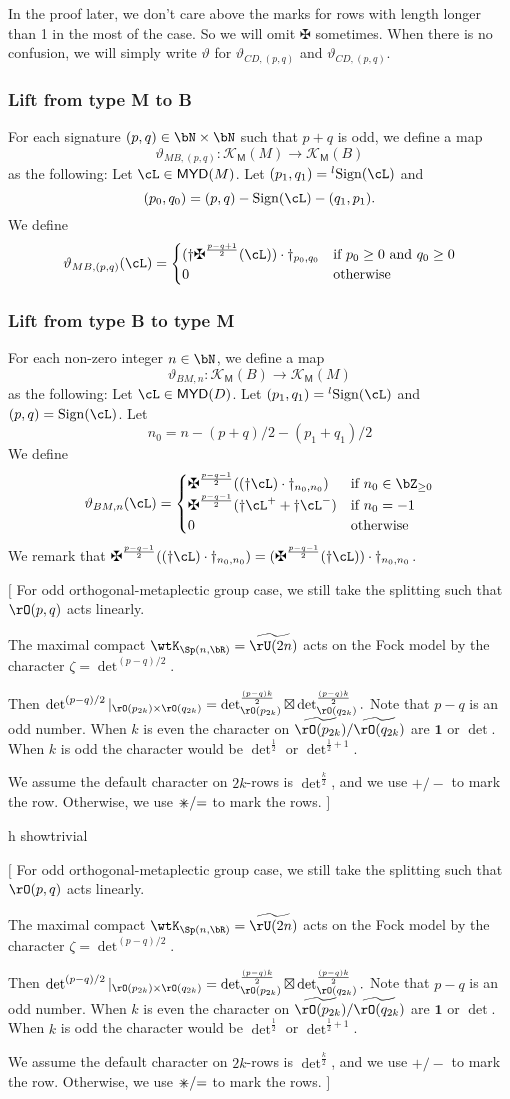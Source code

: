 \documentclass[12pt,a4paper]{amsart}
\newcommand{\trivial}[2][]{\if\relax\detokenize{#1}\relax
  {%
      \color{orange} \vspace{0em} $[$  #2 $]$
      \color{black}
  }
  \else
\ifx#1h
\ifcsname showtrivial\endcsname
{%
    \color{orange} \vspace{0em}  $[$ #2 $]$
    \color{black}
}
\fi
\else {\red Wrong argument!} \fi
\fi
}
\newcommand{\bfone}{\mathbf{1}}
\def\MYD{{\mathsf{MYD}}}
\def\KM{{\mathcal{K_{\mathsf{M}}}}}
\numberwithin{equation}{section}
\theoremstyle{remark}
\def\half{{\tfrac{1}{2}}}
\def\lsign{{}^l\mathrm{Sign}}
\def\ssign{\mathrm{Sign}}
\def\umm{{=}}
\def\upp{{\ast}}
\def\upp{
  {{\setbox0\hbox{$\times$}
      \rlap{\hbox to \wd0{\hss$+$\hss}}\box0
    }}
}
\begin{document}
{
  \color{red}
  In the proof later, we don't care above the marks for rows with length longer
  than 1 in the most of the case. So we will omit $\maltese$ sometimes.
  When there is no confusion, we will simply write $\vartheta$ for
  $\vartheta_{CD,(p,q)}$ and $\vartheta_{CD,(p,q)}$.
}


\subsubsection{Lift from type M to B}

For each signature $(p,q)\in \bN\times \bN$ such that $p+q$ is odd, we define a map
\[
  \vartheta_{MB,(p,q)} \colon \KM(M)\rightarrow \KM(B)
\]
as the following:
Let $\cL\in \MYD(M)$. Let $(p_{1},q_{1})=\lsign(\cL)$ and
\[
(p_{0}, q_{0})  = (p,q) -\ssign(\cL)-(q_{1},p_{1}).
\]
We define
\[
  \vartheta_{MB,(p,q)}(\cL) =
  \begin{cases}
    (\dagger \maltese^{\frac{p-q+1}{2}}(\cL))\cdot \dagger_{p_{0}, q_{0}} &
    \text{if } p_{0}\geq 0 \text{ and } q_{0} \geq 0\\
    0 & \text{otherwise}
  \end{cases}
\]


\subsubsection{Lift from type B to type M}

For each non-zero integer $n\in \bN$, we define a map
\[
  \vartheta_{BM,n} \colon \KM(B)\rightarrow \KM(M)
\]
as the following:
Let $\cL\in \MYD(D)$. Let $(p_{1},q_{1})=\lsign(\cL)$ and
$(p,q) = \ssign(\cL)$.
Let
\[
  n_{0} = n - (p+q)/2 - (p_{1}+q_{1})/2
\]
We define
\[
  \vartheta_{BM,n}(\cL) =
  \begin{cases}
    \maltese^{\frac{p-q-1}{2}}((\dagger \cL)\cdot \dagger_{n_{0}, n_{0}}) &
    \text{if } n_{0}\in \bZ_{\geq 0}\\
    \maltese^{\frac{p-q-1}{2}}(\dagger \cL^{+}  + \dagger \cL^{-})& \text{if } n_{0}=-1\\
    0&\text{otherwise}
  \end{cases}
\]
We remark that
$\maltese^{\frac{p-q-1}{2}}((\dagger \cL)\cdot \dagger_{n_{0}, n_{0}})= (\maltese^{\frac{p-q-1}{2}}(\dagger\cL))\cdot \dagger_{n_{0},n_{0}}$.

\trivial{
  For odd orthogonal-metaplectic group case, we still take the splitting such
  that $\rO(p,q)$ acts linearly.

  The maximal compact $\wtK_{\Sp(n,\bR)}= \widetilde{\rU(2n)}$ acts on the Fock model by the
  character $\zeta=\det^{(p-q)/2}$.

  Then
  $\det^{(p-q)/2}|_{\rO(p_{2k})\times \rO(q_{2k})}=\det^{\frac{(p-q)k}{2}}_{\rO(p_{2k})}\boxtimes
  \det^{\frac{(p-q)k}{2}}_{\rO(q_{2k})}. $
  Note that $p-q$ is an odd number.
  When $k$ is even the character on $\widetilde{\rO(p_{2k})}/\widetilde{\rO(q_{2k})}$ are
  $\bfone$ or $\det$. When $k$ is odd the character would be $\det^{\half}$ or
  $\det^{\half+1}$.

  We assume the default character on $2k$-rows is $\det^{\frac{k}{2}}$, and
  we use $+/-$ to mark the row. Otherwise, we use $\upp/\umm$ to mark the rows.
}
\end{document}
